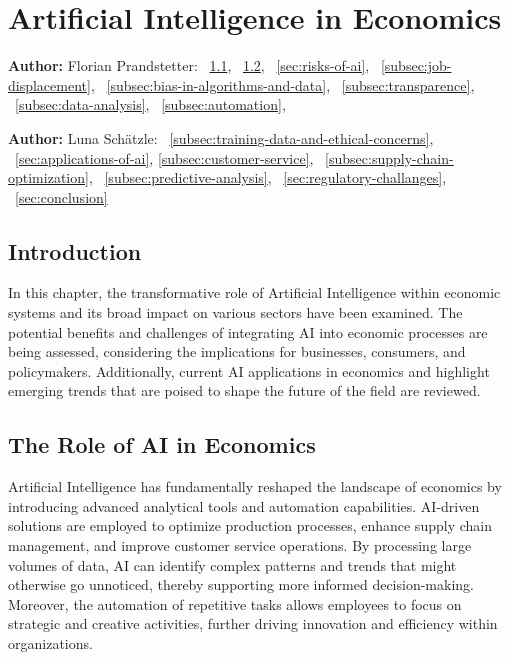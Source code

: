 \chapter{Artificial Intelligence in Economics}
\label{chap:Artificial_Intelligence_in_Economics}
\textbf{Author:} Florian Prandstetter: ~\ref{sec:introduction}, ~\ref{sec:role-of-ai-in-economics}, ~\ref{sec:risks-of-ai}, ~\ref{subsec:job-displacement}, ~\ref{subsec:bias-in-algorithms-and-data}, ~\ref{subsec:transparence}, ~\ref{subsec:data-analysis}, ~\ref{subsec:automation}, 

\textbf{Author:} Luna Schätzle: ~\ref{subsec:training-data-and-ethical-concerns}, ~\ref{sec:applications-of-ai}, \ref{subsec:customer-service}, ~\ref{subsec:supply-chain-optimization}, ~\ref{subsec:predictive-analysis}, ~\ref{sec:regulatory-challanges}, ~\ref{sec:conclusion}


\section{Introduction}
\label{sec:introduction}

In this chapter, the transformative role of Artificial Intelligence within economic systems and its broad impact on various sectors have been examined. The potential benefits and challenges of integrating AI into economic processes are being assessed, considering the implications for businesses, consumers, and policymakers. Additionally, current AI applications in economics and highlight emerging trends that are poised to shape the future of the field are reviewed.

\section{The Role of AI in Economics}
\label{sec:role-of-ai-in-economics}

Artificial Intelligence has fundamentally reshaped the landscape of economics by introducing advanced analytical tools and automation capabilities. AI-driven solutions are employed to optimize production processes, enhance supply chain management, and improve customer service operations. By processing large volumes of data, AI can identify complex patterns and trends that might otherwise go unnoticed, thereby supporting more informed decision-making. Moreover, the automation of repetitive tasks allows employees to focus on strategic and creative activities, further driving innovation and efficiency within organizations.

